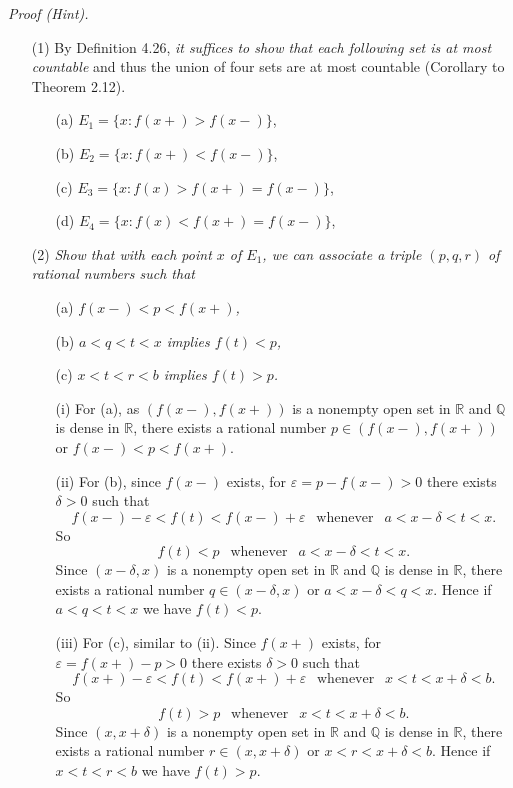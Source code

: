 \documentclass{article}
\begin{document}
\emph{Proof (Hint).}
\begin{enumerate}
  \item[(1)]
  By Definition 4.26,
  \emph{it suffices to show that each following set is at most countable}
  and thus the union of four sets are at most countable (Corollary to Theorem 2.12).
  \begin{enumerate}
    \item[(a)]
    $E_1 = \{ x : f(x+) > f(x-) \}$,

    \item[(b)]
    $E_2 = \{ x : f(x+) < f(x-) \}$,

    \item[(c)]
    $E_3 = \{ x : f(x) > f(x+) = f(x-) \}$,

    \item[(d)]
    $E_4 = \{ x : f(x) < f(x+) = f(x-) \}$,
  \end{enumerate}

  \item[(2)]
  \emph{Show that with each point $x$ of $E_1$,
  we can associate a triple $(p,q,r)$ of rational numbers such that}
  \begin{enumerate}
    \item[(a)]
    \emph{$f(x-) < p < f(x+)$,}
    \item[(b)]
    \emph{$a < q < t < x$ implies $f(t) < p$,}
    \item[(c)]
    \emph{$x < t < r < b$ implies $f(t) > p$.}
  \end{enumerate}
  \begin{enumerate}
    \item[(i)]
    For (a), as $(f(x-),f(x+))$ is a nonempty open set in $\mathbb{R}$
    and $\mathbb{Q}$ is dense in $\mathbb{R}$,
    there exists a rational number $p \in (f(x-),f(x+))$ or $f(x-) < p < f(x+)$.

    \item[(ii)]
    For (b), since $f(x-)$ exists, for $\varepsilon = p - f(x-) > 0$
    there exists $\delta > 0$ such that
    \[
      f(x-)-\varepsilon < f(t) < f(x-)+\varepsilon
      \:\:\text{ whenever }\:\:
      a < x - \delta < t < x.
    \]
    So
    \[
      f(t) < p
      \:\:\text{ whenever }\:\:
      a < x - \delta < t < x.
    \]
    Since $(x-\delta,x)$ is a nonempty open set in $\mathbb{R}$
    and $\mathbb{Q}$ is dense in $\mathbb{R}$,
    there exists a rational number $q \in (x-\delta,x)$ or $a < x-\delta < q < x$.
    Hence if $a < q < t < x$ we have $f(t) < p$.

    \item[(iii)]
    For (c), similar to (ii).
    Since $f(x+)$ exists, for $\varepsilon = f(x+) - p > 0$
    there exists $\delta > 0$ such that
    \[
      f(x+)-\varepsilon < f(t) < f(x+)+\varepsilon
      \:\:\text{ whenever }\:\:
      x < t < x + \delta < b.
    \]
    So
    \[
      f(t) > p
      \:\:\text{ whenever }\:\:
      x < t < x + \delta < b.
    \]
    Since $(x,x+\delta)$ is a nonempty open set in $\mathbb{R}$
    and $\mathbb{Q}$ is dense in $\mathbb{R}$,
    there exists a rational number $r \in (x,x+\delta)$ or $x < r < x+\delta < b$.
    Hence if $x < t < r < b$ we have $f(t) > p$.
  \end{enumerate}


\end{enumerate}
\end{document}
